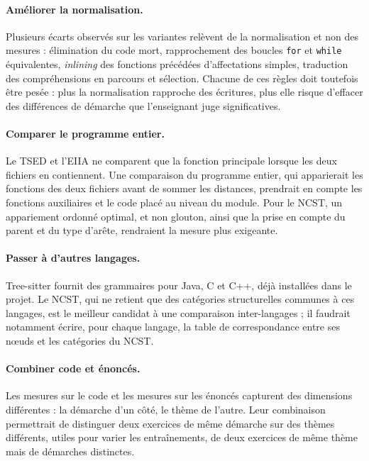 \documentclass[12pt,a4paper,oneside]{report}
\begin{document}
\paragraph{Améliorer la normalisation.}
Plusieurs écarts observés sur les variantes relèvent de la normalisation et
non des mesures : élimination du code mort, rapprochement des boucles
\texttt{for} et \texttt{while} équivalentes, \emph{inlining} des fonctions
précédées d'affectations simples, traduction des compréhensions en
parcours et sélection. Chacune de ces règles doit toutefois être pesée :
plus la normalisation rapproche des écritures, plus elle risque d'effacer
des différences de démarche que l'enseignant juge significatives.

\paragraph{Comparer le programme entier.}
Le TSED et l'EIIA ne comparent que la fonction principale lorsque les deux
fichiers en contiennent. Une comparaison du programme entier, qui
apparierait les fonctions des deux fichiers avant de sommer les
distances, prendrait en compte les fonctions auxiliaires et le code placé
au niveau du module. Pour le NCST, un appariement ordonné optimal, et non
glouton, ainsi que la prise en compte du parent et du type d'arête,
rendraient la mesure plus exigeante.

\paragraph{Passer à d'autres langages.}
Tree-sitter fournit des grammaires pour Java, C et C++, déjà installées
dans le projet. Le NCST, qui ne retient que des catégories structurelles
communes à ces langages, est le meilleur candidat à une comparaison
inter-langages ; il faudrait notamment écrire, pour chaque langage, la
table de correspondance entre ses nœuds et les catégories du NCST.

\paragraph{Combiner code et énoncés.}
Les mesures sur le code et les mesures sur les énoncés capturent des
dimensions différentes : la démarche d'un côté, le thème de l'autre. Leur
combinaison permettrait de distinguer deux exercices de même démarche sur
des thèmes différents, utiles pour varier les entraînements, de deux
exercices de même thème mais de démarches distinctes.
\end{document}
